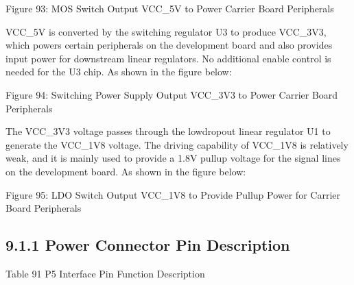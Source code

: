 \documentclass[letterpaper,10pt,openany,english]{sphinxmanual}
\begin{document}
\sphinxAtStartPar
{}

\sphinxAtStartPar
Figure 9\sphinxhyphen{}3: MOS Switch Output VCC\_5V to Power Carrier Board Peripherals

\sphinxAtStartPar
VCC\_5V is converted by the switching regulator U3 to produce VCC\_3V3, which powers certain peripherals on the development board and also provides input power for downstream linear regulators. No additional enable control is needed for the U3 chip. As shown in the figure below:

\sphinxAtStartPar
{}

\sphinxAtStartPar
Figure 9\sphinxhyphen{}4: Switching Power Supply Output VCC\_3V3 to Power Carrier Board Peripherals

\sphinxAtStartPar
The VCC\_3V3 voltage passes through the low\sphinxhyphen{}dropout linear regulator U1 to generate the VCC\_1V8 voltage. The driving capability of VCC\_1V8 is relatively weak, and it is mainly used to provide a 1.8V pull\sphinxhyphen{}up voltage for the signal lines on the development board. As shown in the figure below:

\sphinxAtStartPar
{}

\sphinxAtStartPar
Figure 9\sphinxhyphen{}5: LDO Switch Output VCC\_1V8 to Provide Pull\sphinxhyphen{}up Power for Carrier Board Peripherals


\subsection{9.1.1 Power Connector Pin Description}
\label{\detokenize{hardware:power-connector-pin-description}}
\sphinxAtStartPar
Table 9\sphinxhyphen{}1 P5 Interface Pin Function Description
\end{document}
